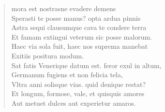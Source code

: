 \documentclass[11pt, a4paper]{report}
\begin{document}
\begin{verse}
mora est \rbrack  nostrasne evadere demens \\ Sperasti te posse manus? opta ardua pinnis \\ Astra sequi clausumque cava te condere terra \\ Et famam extingui veterum sic posse malorum. \\ Haec via sola fuit, haec nos suprema manebat \\ Exitiis positura modum. \\ Sat fatis Venerique datum est. feror exul in altum, \\ Germanum fugiens et non felicia tela, \\ Vltra anni solisque vias. quid denique restat? \\ Et longum, formose, vale, et quisquis amores \\ Aut metuet dulces aut experietur amaros. \\ 
      \end{verse}
  
\end{document}
